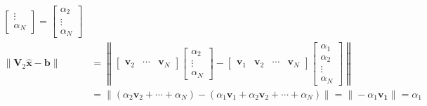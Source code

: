 \documentclass[]{article}
\newcommand{\unit}[1]{\bm{\hat{#1}}}
\begin{document}
\begin{align}
\begin{bmatrix}
	\vdots \\
	\alpha_N
	\end{bmatrix} = \begin{bmatrix}
	\alpha_2 \\
	\vdots \\
	\alpha_N
	\end{bmatrix} \\
	\|\bm{V}_2\unit{x} - \bm{b}\| &= \left\|\begin{bmatrix}
	\bm{v}_2 & \cdots & \bm{v}_N
	\end{bmatrix}
	\begin{bmatrix}
	\alpha_2 \\
	\vdots \\
	\alpha_N
	\end{bmatrix} - 
	\begin{bmatrix}
	\bm{v}_1 & \bm{v}_2 & \cdots & \bm{v}_N
	\end{bmatrix}
	\begin{bmatrix}
	\alpha_1 \\
	\alpha_2 \\
	\vdots \\
	\alpha_N
	\end{bmatrix}\right\| \\
	&= \left\|(\alpha_2 \bm{v}_2 + \cdots + \alpha_N) - (\alpha_1 \bm{v}_1 + \alpha_2 \bm{v}_2 + \cdots + \alpha_N)\right\| = \|-\alpha_1 \bm{v_1}\| = \alpha_1
\end{align}

\subsection{}
\end{document}

